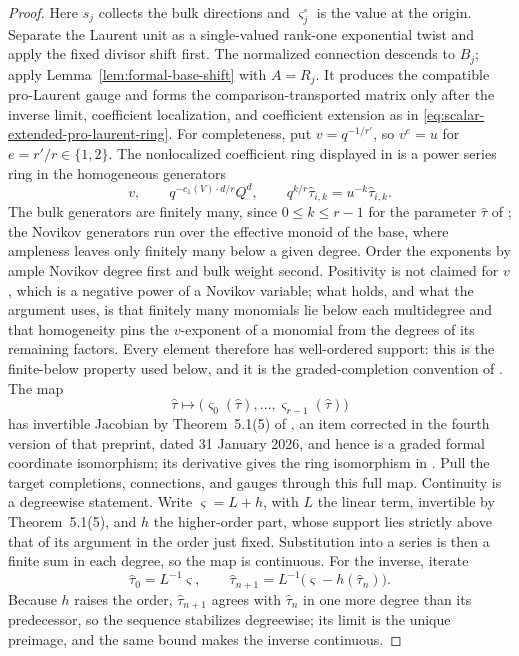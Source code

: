 \begin{proof}
Here \(s_j\) collects the bulk directions and \(\varsigma_j^\circ\) is the
value at the origin.
Separate the Laurent unit as a single-valued rank-one exponential twist and
apply the fixed divisor shift first.  The normalized connection descends to
\(B_j\); apply Lemma~\ref{lem:formal-base-shift} with \(A=R_j\).  It produces
the compatible pro-Laurent gauge and forms the comparison-transported matrix
only after the inverse limit, coefficient localization, and coefficient
extension as in \eqref{eq:scalar-extended-pro-laurent-ring}.
For completeness, put \(v=q^{-1/r'}\), so \(v^e=u\) for
\(e=r'/r\in\{1,2\}\).  The nonlocalized coefficient ring displayed in
\cite[Section~5.5]{IritaniKoto} is a power series ring in the homogeneous
generators
\[
 v,\qquad q^{-c_1(V)\cdot d/r}Q^d,\qquad
 q^{k/r}\widehat\tau_{i,k}=u^{-k}\widehat\tau_{i,k}.
 \tag{4.4d}
 \label{eq:projective-scaled-completion-variables}
\]
The bulk generators are finitely many, since \(0\le k\le r-1\) for the
parameter \(\widehat\tau\) of \cite[Theorem~5.1]{IritaniKoto}; the Novikov
generators run over the effective monoid of the base, where ampleness leaves
only finitely many below a given degree.  Order the exponents by ample Novikov
degree first and bulk weight second.  Positivity is not claimed for \(v\),
which is a negative power of a Novikov variable; what holds, and what the
argument uses, is that finitely many monomials lie below each multidegree and
that homogeneity pins the \(v\)-exponent of a monomial from the degrees of
its remaining factors.  Every element therefore has well-ordered support: this
is the finite-below property used below, and it is the graded-completion
convention of
\cite[Section~5.1, especially (5.1)--(5.3)]{IritaniKoto}.  The map
\[
 \widehat\tau\longmapsto
 \bigl(\varsigma_0(\widehat\tau),\ldots,
       \varsigma_{r-1}(\widehat\tau)\bigr)
 \tag{4.4e}
 \label{eq:projective-full-coordinate-map}
\]
has invertible Jacobian by Theorem~5.1(5) of \cite{IritaniKoto}, an item
corrected in the fourth version of that preprint, dated 31 January 2026, and
hence is a graded formal coordinate isomorphism; its derivative gives the ring
isomorphism in \cite[Corollary~1.8]{IritaniKoto}.  Pull the target completions, connections,
and gauges through this full map.  Continuity is a degreewise statement.
Write \(\varsigma=L+h\), with \(L\) the linear term, invertible by
Theorem~5.1(5), and \(h\) the higher-order part, whose support lies strictly
above that of its argument in the order just fixed.  Substitution into a
series is then a finite sum in each degree, so the map is continuous.  For the
inverse, iterate
\[
 \widehat\tau_0=L^{-1}\varsigma,
 \qquad
 \widehat\tau_{n+1}=L^{-1}\bigl(\varsigma-h(\widehat\tau_n)\bigr).
\]
Because \(h\) raises the order, \(\widehat\tau_{n+1}\) agrees with
\(\widehat\tau_n\) in one more degree than its predecessor, so the sequence
stabilizes degreewise; its limit is the unique preimage, and the same bound
makes the inverse continuous.


\end{proof}
